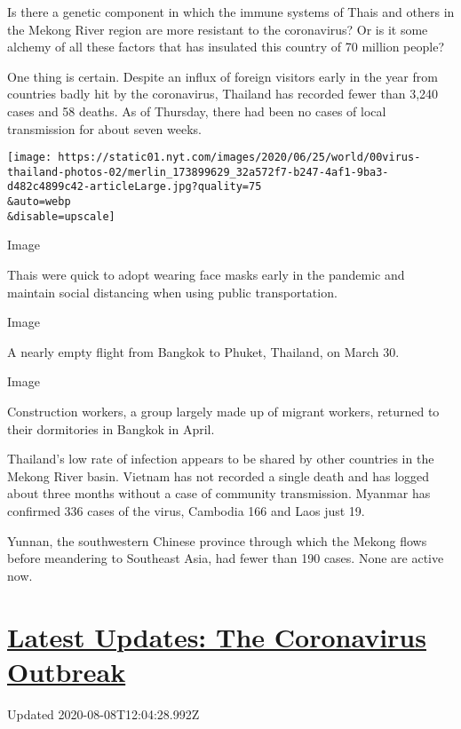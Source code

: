 Is there a genetic component in which the immune systems of Thais and
others in the Mekong River region are more resistant to the coronavirus?
Or is it some alchemy of all these factors that has insulated this
country of 70 million people?

One thing is certain. Despite an influx of foreign visitors early in the
year from countries badly hit by the coronavirus, Thailand has recorded
fewer than 3,240 cases and 58 deaths. As of Thursday, there had been no
cases of local transmission for about seven weeks.

\texttt{[image: https://static01.nyt.com/images/2020/06/25/world/00virus-thailand-photos-02/merlin\_173899629\_32a572f7-b247-4af1-9ba3-d482c4899c42-articleLarge.jpg?quality=75\\\&auto=webp\\\&disable=upscale]}

Image

Thais were quick to adopt wearing face masks early in the pandemic and
maintain social distancing when using public transportation.~

Image

A nearly empty flight from Bangkok to Phuket, Thailand, on March 30.

Image

Construction workers, a group largely made up of migrant workers,
returned to their dormitories in Bangkok in April.

Thailand's low rate of infection appears to be shared by other countries
in the Mekong River basin. Vietnam has not recorded a single death and
has logged about three months without a case of community transmission.
Myanmar has confirmed 336 cases of the virus, Cambodia 166 and Laos just
19.

Yunnan, the southwestern Chinese province through which the Mekong flows
before meandering to Southeast Asia, had fewer than 190 cases. None are
active now.

\hypertarget{latest-updates-the-coronavirus-outbreak}{%
\section{\texorpdfstring{\href{https://www.nytimes.com/2020/08/07/world/covid-19-news.html?action=click\&pgtype=Article\&state=default\&region=MAIN_CONTENT_1\&context=storylines_live_updates}{Latest
Updates: The Coronavirus
Outbreak}}{Latest Updates: The Coronavirus Outbreak}}\label{latest-updates-the-coronavirus-outbreak}}

Updated 2020-08-08T12:04:28.992Z

